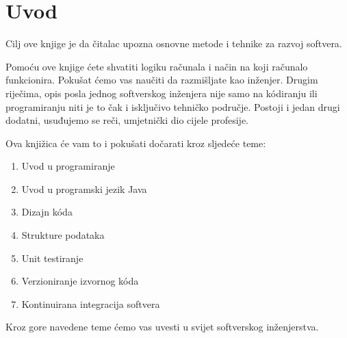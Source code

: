 \chapter*{Uvod}
Cilj ove knjige je da čitalac upozna osnovne metode i tehnike za razvoj softvera.

Pomoću ove knjige ćete shvatiti logiku računala i način na koji računalo funkcionira. Pokušat ćemo vas naučiti da razmišljate kao inženjer. Drugim riječima, opis posla jednog softverskog inženjera nije samo na kódiranju ili programiranju niti je to čak i isključivo tehničko područje. Postoji i jedan drugi dodatni, usuđujemo se reči, umjetnički dio cijele profesije.

Ova knjižica će vam to i pokušati dočarati kroz sljedeće teme:

\begin{enumerate}
    \item Uvod u programiranje
    \item Uvod u programski jezik Java
    \item Dizajn kóda
    \item Strukture podataka
    \item Unit testiranje
    \item Verzioniranje izvornog kóda
    \item Kontinuirana integracija softvera
\end{enumerate}

Kroz gore navedene teme ćemo vas uvesti u svijet softverskog inženjerstva.